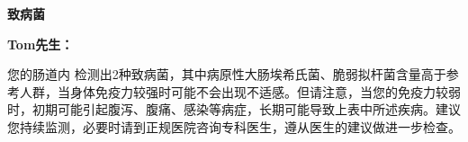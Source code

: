 

\usepackage{graphicx}
\graphicspath{{cores/}}



\setlength{\arrayrulewidth}{0.5pt}
\fontsize{9.3pt}{17pt}\selectfont
\color{gray2}

\vspace*{0mm}
\begin{center}
{\bf\sanhao 致病菌}
\end{center}

\medskip

\noindent
{\bf\xiaosihao Tom先生：}


\bigskip


您的肠道内
检测出2种致病菌，其中病原性大肠埃希氏菌、脆弱拟杆菌含量高于参考人群，当身体免疫力较强时可能不会出现不适感。但请注意，当您的免疫力较弱时，初期可能引起腹泻、腹痛、感染等病症，长期可能导致上表中所述疾病。建议您持续监测，必要时请到正规医院咨询专科医生，遵从医生的建议做进一步检查。

